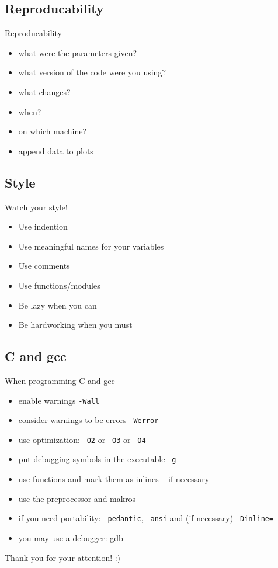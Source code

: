 \documentclass[12pt,compress,mathserif]{beamer}
\begin{document}
\subsection{Reproducability}
\begin{frame}{Reproducability}
\begin{itemize}
\item what were the parameters given?
\item what version of the code were you using?
\item what changes?
\item when?
\item on which machine?
\item append data to plots
\end{itemize}
\end{frame}

\subsection{Style}
\begin{frame}{Watch your style!}
    \begin{itemize}
        \item Use indention
        \item Use meaningful names for your variables
        \item Use comments
        \item Use functions/modules
        \item Be lazy when you can
        \item Be hardworking when you must
    \end{itemize}
\end{frame}

\subsection{C and gcc}
\begin{frame}{When programming C and gcc}
\begin{itemize}
    \item enable warnings \texttt{-Wall} 
    \item consider warnings to be errors \texttt{-Werror}
    \item use optimization: \texttt{-O2} or \texttt{-O3} or \texttt{-O4}
    \item put debugging symbols in the executable \texttt{-g}
    \item use functions and mark them as inlines -- if necessary
    \item use the preprocessor and makros
    \item if you need portability: \texttt{-pedantic}, \texttt{-ansi} and (if necessary) \texttt{-Dinline=}
    \item you may use a debugger: gdb
\end{itemize}
\end{frame}

\begin{frame}
\huge
\begin{center}
Thank you for your attention! :)
\end{center}
\end{frame}
\end{document}

